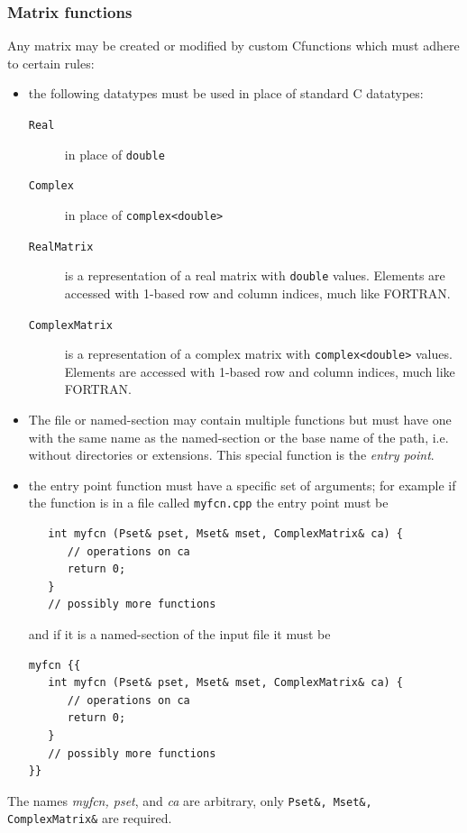 \documentclass[10pt,openany,twoside]{book}
\numberwithin{equation}{section}   %
\def\Cpp{{C\nolinebreak[4]\hspace{-.05em}\raisebox{.4ex}{\tiny\bf ++}}\:}
\newcommand{\Subst}[1]{{\sl\sf #1}}
\newcommand{\Newterm}[1]{{\em #1}}
\newcommand{\Code}[1]{{\small\tt #1}}
\begin{document}
\subsubsection{Matrix functions}\label{sect:matrix-functions}
Any matrix may be created or modified by custom \Cpp functions
which must adhere to certain rules:
\begin{itemize}
	\item the following datatypes must be used in place of standard \Cpp
		datatypes:
		\begin{description}
			\item[\Code{Real}] in place of \Code{double}
			\item[\Code{Complex}] in place of \Code{complex<double>}
			\item[\Code{RealMatrix}] is a representation of a real matrix with
				\Code{double} values. Elements are accessed with 1-based row
					and column indices, much like FORTRAN.
			\item[\Code{ComplexMatrix}] is a representation of a complex matrix with
				\Code{complex<double>} values. Elements are accessed with 1-based row
					and column indices, much like FORTRAN.
		\end{description}
	\item The file or named-section may contain
		multiple functions but must have one with the same name as the named-section
		or the base name of the path, i.e. without directories or extensions. This
		special function is the \Newterm{entry point}.
	\item the entry point function must have a specific set
		of arguments; for example if the function is in a file called \Code{myfcn.cpp}
		the entry point must be
\begin{lstlisting}
   int myfcn (Pset& pset, Mset& mset, ComplexMatrix& ca) {
      // operations on ca
      return 0;
   }
   // possibly more functions
\end{lstlisting}
and if it is a named-section of the input file it must be
\begin{lstlisting}
myfcn {{
   int myfcn (Pset& pset, Mset& mset, ComplexMatrix& ca) {
      // operations on ca
      return 0;
   }
   // possibly more functions
}}
\end{lstlisting}
\end{itemize}

The names \Subst{myfcn, pset}, and \Subst{ca} are arbitrary, only
\Code{Pset\&, Mset\&, ComplexMatrix\&} are required.
\end{document}
